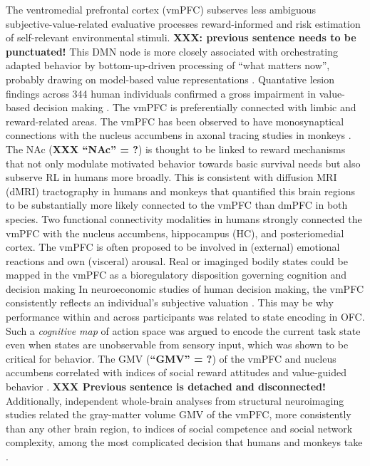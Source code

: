 \documentclass[10pt,letterpaper]{article}
\begin{document}
The ventromedial prefrontal cortex (vmPFC) subserves
less ambiguous subjective-value-related evaluative processes
reward-informed and risk estimation of self-relevant environmental stimuli.
\textbf{XXX: previous sentence needs to be punctuated!}
This DMN node is more closely associated with
orchestrating adapted behavior by bottom-up-driven
processing of “what matters now”,
probably drawing on model-based value representations
\citep{doherty2015structure}.
Quantative lesion findings across 344 human individuals confirmed
a gross impairment in value-based decision making
\citep{glascher2012lesion}.
The vmPFC is preferentially connected with limbic and reward-related areas.
The vmPFC has been observed to have monosynaptical connections
with the nucleus accumbens
in axonal tracing studies in monkeys \citep{haber1995orbital}.
The NAc (\textbf{XXX ``NAc'' = ?}) is thought to be linked to reward mechanisms that not
only modulate motivated behavior towards basic survival needs but also
subserve RL in humans more broadly.
This is consistent with diffusion MRI (dMRI) tractography in humans and monkeys
\citep{croxson2005quantitative} that
quantified this brain regions to
be substantially more likely connected to the vmPFC than dmPFC in both species.
Two functional connectivity modalities in humans strongly connected
the vmPFC with the nucleus accumbens, hippocampus (HC),
and posteriomedial cortex.
%
The vmPFC is often proposed to be involved in (external) emotional
reactions and own (visceral) arousal.
Real or imaginged bodily states could be mapped in the vmPFC
as a bioregulatory disposition governing cognition
and decision making \citep{damasio1996somatic}
In neuroeconomic studies of human decision making,
the vmPFC consistently reflects an individual’s subjective
valuation
\citep{behrens2008associative}.
This may be why performance within and across participants
was related to state encoding in OFC.
Such a \textit{cognitive map} of action space was argued to encode
the current task state even when states are unobservable from sensory input,
which was shown to be critical for behavior.
The GMV (\textbf{``GMV'' = ?}) of the vmPFC and nucleus accumbens
correlated with indices of social reward attitudes and
value-guided behavior \citep{lebreton2009automatic}.
\textbf{XXX Previous sentence is detached and disconnected!}
Additionally,
independent whole-brain analyses from structural
neuroimaging studies related the gray-matter volume GMV of the vmPFC,
more consistently than any other
brain region, to indices of
social competence and social network complexity,
among the most complicated decision that humans and monkeys take
\citep{behrens2009computation}.
%
\end{document}
